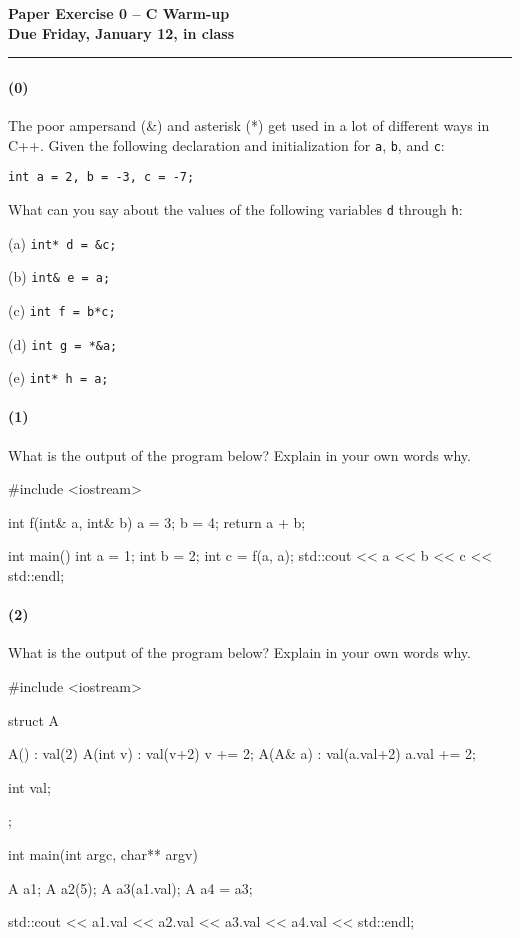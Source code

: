 \documentclass[12pt,letterpaper,twoside]{article}
\begin{document}
{\centering \textbf{Paper Exercise 0 -- C Warm-up\\ Due Friday, January 12, in class} \par}
\vspace*{-8pt}\noindent\rule{\linewidth}{1pt}

\paragraph{(0)} The poor ampersand (\&) and asterisk (*) get used in a lot of different ways in C++. Given the following declaration and initialization for {\tt a}, {\tt b}, and {\tt c}:
\begin{verbatim}
int a = 2, b = -3, c = -7;
\end{verbatim}
What can you say about the values of the following variables {\tt d} through {\tt h}:
\begin{compactenum}
\item[(a)] \texttt{int* d = \&c;}
\item[(b)] \texttt{int\& e = a;}
\item[(c)] \texttt{int f = b*c;} 
\item[(d)] \texttt{int g = *\&a;} 
\item[(e)] \texttt{int* h = a;}
\end{compactenum}


\paragraph{(1)} What is the output of the program below? Explain in your own words why.
\begin{cpp}
#include <iostream>

int f(int& a, int& b) {
  a = 3;
  b = 4;
  return a + b;
}

int main() {
  int a = 1;
  int b = 2;
  int c = f(a, a);
  std::cout << a << b << c << std::endl;
}
\end{cpp}


\paragraph{(2)} What is the output of the program below? Explain in your own words why.

\begin{cpp}
#include <iostream>

struct A
{
  A() : val(2) {}
  A(int v) : val(v+2) { v += 2; }
  A(A& a) : val(a.val+2) { a.val += 2; } 

  int val;
};

int main(int argc, char** argv)
{
  A a1;
  A a2(5);
  A a3(a1.val);
  A a4 = a3;
  
  std::cout << a1.val << a2.val << a3.val << a4.val << std::endl;
}
\end{cpp}

\end{document}

